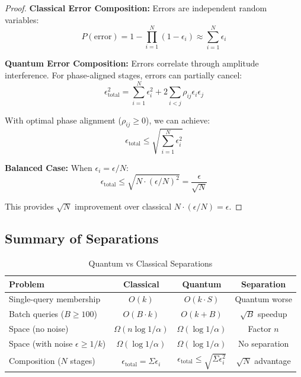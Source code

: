 \documentclass[11pt,letterpaper]{article}
\begin{document}
\begin{proof}
\textbf{Classical Error Composition:} Errors are independent random variables:
\begin{equation}
P(\text{error}) = 1 - \prod_{i=1}^N (1-\epsilon_i) \approx \sum_{i=1}^N \epsilon_i
\end{equation}

\textbf{Quantum Error Composition:} Errors correlate through amplitude interference. For phase-aligned stages, errors can partially cancel:
\begin{equation}
\epsilon_{\text{total}}^2 = \sum_{i=1}^N \epsilon_i^2 + 2\sum_{i<j} \rho_{ij} \epsilon_i \epsilon_j
\end{equation}

With optimal phase alignment ($\rho_{ij} \geq 0$), we can achieve:
\begin{equation}
\epsilon_{\text{total}} \leq \sqrt{\sum_{i=1}^N \epsilon_i^2}
\end{equation}

\textbf{Balanced Case:} When $\epsilon_i = \epsilon/N$:
\begin{equation}
\epsilon_{\text{total}} \leq \sqrt{N \cdot (\epsilon/N)^2} = \frac{\epsilon}{\sqrt{N}}
\end{equation}

This provides $\sqrt{N}$ improvement over classical $N \cdot (\epsilon/N) = \epsilon$.
\end{proof}

\subsection{Summary of Separations}

\begin{table}[ht]
\centering
\caption{Quantum vs Classical Separations}
\label{tab:separations}
\begin{tabular}{lccc}
\toprule
\textbf{Problem} & \textbf{Classical} & \textbf{Quantum} & \textbf{Separation} \\
\midrule
Single-query membership & $O(k)$ & $O(k \cdot S)$ & Quantum worse \\
Batch queries ($B \geq 100$) & $O(B \cdot k)$ & $O(k + B)$ & $\sqrt{B}$ speedup \\
Space (no noise) & $\Omega(n \log 1/\alpha)$ & $\Omega(\log 1/\alpha)$ & Factor $n$ \\
Space (with noise $\epsilon \geq 1/k$) & $\Omega(\log 1/\alpha)$ & $\Omega(\log 1/\alpha)$ & No separation \\
Composition ($N$ stages) & $\epsilon_{\text{total}} = \Sigma \epsilon_i$ & $\epsilon_{\text{total}} \leq \sqrt{\Sigma \epsilon_i^2}$ & $\sqrt{N}$ advantage \\
\bottomrule
\end{tabular}
\end{table}
\end{document}
